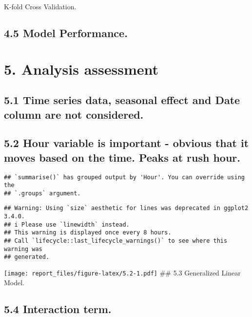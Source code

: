 \documentclass[
]{article}
\begin{document}
K-fold Cross Validation.

\hypertarget{model-performance.}{%
\subsection{4.5 Model Performance.}\label{model-performance.}}

\hypertarget{analysis-assessment}{%
\section{5. Analysis assessment}\label{analysis-assessment}}

\hypertarget{time-series-data-seasonal-effect-and-date-column-are-not-considered.}{%
\subsection{5.1 Time series data, seasonal effect and Date column are
not
considered.}\label{time-series-data-seasonal-effect-and-date-column-are-not-considered.}}

\hypertarget{hour-variable-is-important---obvious-that-it-moves-based-on-the-time.-peaks-at-rush-hour.}{%
\subsection{5.2 Hour variable is important - obvious that it moves based
on the time. Peaks at rush
hour.}\label{hour-variable-is-important---obvious-that-it-moves-based-on-the-time.-peaks-at-rush-hour.}}

\begin{verbatim}
## `summarise()` has grouped output by 'Hour'. You can override using the
## `.groups` argument.
\end{verbatim}

\begin{verbatim}
## Warning: Using `size` aesthetic for lines was deprecated in ggplot2 3.4.0.
## i Please use `linewidth` instead.
## This warning is displayed once every 8 hours.
## Call `lifecycle::last_lifecycle_warnings()` to see where this warning was
## generated.
\end{verbatim}

\texttt{[image: report\_files/figure-latex/5.2-1.pdf]} \#\# 5.3
Generalized Linear Model.

\hypertarget{interaction-term.}{%
\subsection{5.4 Interaction term.}\label{interaction-term.}}
\end{document}
